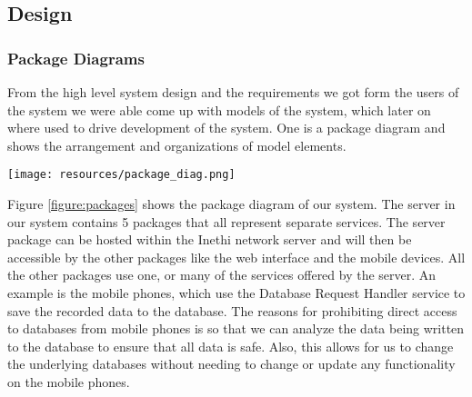 \subsection{Design}\label{subsec:design}
\subsubsection{Package Diagrams}
From the high level system design and the requirements we got form the users of the system we were able come up with models of the system, which later on where used to drive development of the system.
One is a package diagram and shows the arrangement and organizations of model elements.
\begin{figure*}
    \begin{center}
        \texttt{[image: resources/package\_diag.png]}
    \end{center}
    \caption{Showing UML package diagrams of the system.}
    \label{figure:packages}
\end{figure*}
Figure \ref{figure:packages} shows the package diagram of our system.
The server in our system contains 5 packages that all represent separate services.
The server package can be hosted within the Inethi network server and will then be accessible by the other packages like the web interface and the mobile devices.
All the other packages use one, or many of the services offered by the server.
An example is the mobile phones, which use the Database Request Handler service to save the recorded data to the database.
The reasons for prohibiting direct access to databases from mobile phones is so that we can analyze the data being written to the database to ensure that all data is safe.
Also, this allows for us to change the underlying databases without needing to change or update any functionality on the mobile phones.

